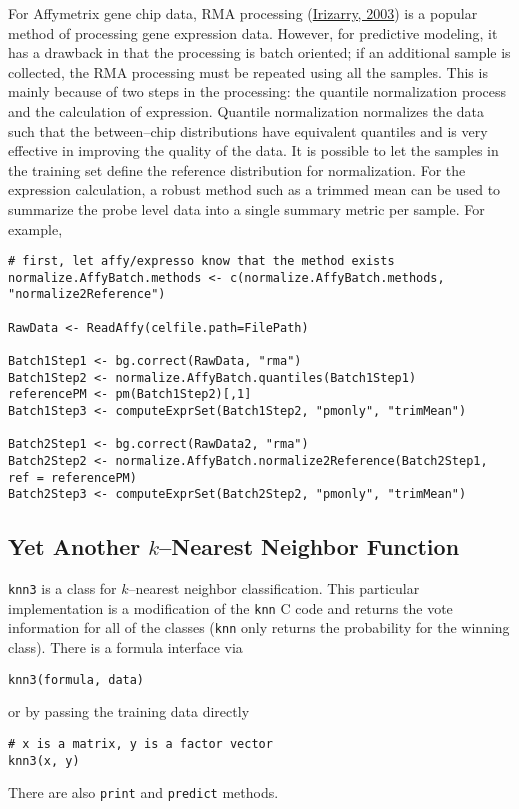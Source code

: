 \documentclass[12pt]{article}
\begin{document}
For Affymetrix gene chip data, RMA processing (\href{http://nar.oxfordjournals.org/cgi/content/abstract/31/4/e15}{Irizarry, 2003}) is a popular method of processing gene expression data. However, for predictive modeling, it has a drawback in that the processing is batch oriented; if an additional sample is collected, the RMA processing must be repeated using all the samples. This is mainly because of two steps in the processing: the quantile normalization process and the calculation of expression. Quantile normalization normalizes the data such that the between--chip distributions have equivalent quantiles and is very effective in improving the quality of the data. It is possible to let the samples in the training set define the reference distribution for normalization. For the expression calculation, a robust method such as a trimmed mean can be used to summarize the probe level data into a single summary metric per sample. For example,
\begin{Verbatim}
# first, let affy/expresso know that the method exists
normalize.AffyBatch.methods <- c(normalize.AffyBatch.methods, "normalize2Reference")
   
RawData <- ReadAffy(celfile.path=FilePath)
   
Batch1Step1 <- bg.correct(RawData, "rma")
Batch1Step2 <- normalize.AffyBatch.quantiles(Batch1Step1)
referencePM <- pm(Batch1Step2)[,1]
Batch1Step3 <- computeExprSet(Batch1Step2, "pmonly", "trimMean")  
   
Batch2Step1 <- bg.correct(RawData2, "rma")
Batch2Step2 <- normalize.AffyBatch.normalize2Reference(Batch2Step1, ref = referencePM)
Batch2Step3 <- computeExprSet(Batch2Step2, "pmonly", "trimMean")     
\end{Verbatim}


\subsection{Yet Another $k$--Nearest Neighbor Function}

\texttt{knn3} is a class for $k$--nearest neighbor classification. This particular implementation is a modification of the \texttt{knn} C code and returns the vote information for all of the classes (\texttt{knn} only returns the probability for the winning class). There is a formula interface via
\begin{Verbatim}
knn3(formula, data)
\end{Verbatim}
or by passing the training data directly
\begin{Verbatim}
# x is a matrix, y is a factor vector
knn3(x, y)
\end{Verbatim}
There are also \texttt{print} and \texttt{predict} methods.
\end{document}
